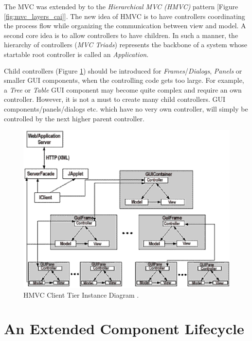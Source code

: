 \documentclass[a4paper,10pt]{llncs}
\begin{document}
The MVC \cite{fowler2002} was extended by \cite{cai}
to the \emph{Hierarchical MVC (HMVC)} pattern [Figure \ref{fig:mvc_layers_cai}].
The new idea of HMVC is to have controllers coordinating the process
flow while organizing the communication between view and model.
A second core idea is to allow controllers to have children.
In such a manner, the hierarchy of controllers (\emph{MVC Triads}) represents the
backbone of a system whose startable root controller is called an \emph{Application}.

Child controllers (Figure \ref{fig:hmvc_client_tier_instance_diagram_cai})
should be introduced for \emph{Frames}/\emph{Dialogs}, \emph{Panels} or smaller GUI components,
when the controlling code gets too large. For example, a \emph{Tree} or \emph{Table} GUI component
may become quite complex and require an own controller. However, it is not a must to create many child controllers.
GUI components/panels/dialogs etc. which have no very own controller, will simply
be controlled by the next higher parent controller.

\begin{figure}[ht]
\begin{center}
\includegraphics[scale=0.4]{hmvc_client_tier_instance_diagram_cai}
\caption{HMVC Client Tier Instance Diagram \cite{cai}.}
\label{fig:hmvc_client_tier_instance_diagram_cai}
\end{center}
\end{figure}

%
%
\section{An Extended Component Lifecycle}
\end{document}
